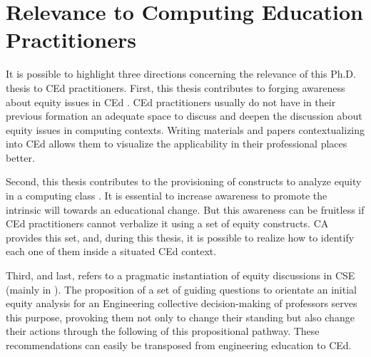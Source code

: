 \section{Relevance to Computing Education Practitioners}
\label{intro-sec:rel-computing}

It is possible to highlight three directions concerning the relevance of this \gls{Ph.D.} thesis to \gls{CEd} practitioners. First, this thesis contributes to forging awareness about equity issues in \gls{CEd} \cite{bispojr:2022-educomp}. \gls{CEd} practitioners usually do not have in their previous formation an adequate space to discuss and deepen the discussion about equity issues in computing contexts. Writing materials and papers contextualizing into \gls{CEd} allows them to visualize the applicability in their professional places better.

Second, this thesis contributes to the provisioning of constructs to analyze equity in a computing class \cite{bispojr:2024-nmp}. It is essential to increase awareness to promote the intrinsic will towards an educational change. But this awareness can be fruitless if \gls{CEd} practitioners cannot verbalize it using a set of equity constructs. \gls{CA} provides this set, and, during this thesis, it is possible to realize how to identify each one of them inside a situated \gls{CEd} context.

Third, and last, refers to a pragmatic instantiation of equity discussions in \gls{CSE} (mainly in \cite{bispojr:2024-online-lab}). The proposition of a set of guiding questions to orientate an initial equity analysis for an Engineering collective decision-making of professors serves this purpose, provoking them not only to change their standing but also change their actions through the following of this propositional pathway. These recommendations can easily be transposed from engineering education to \gls{CEd}.
                